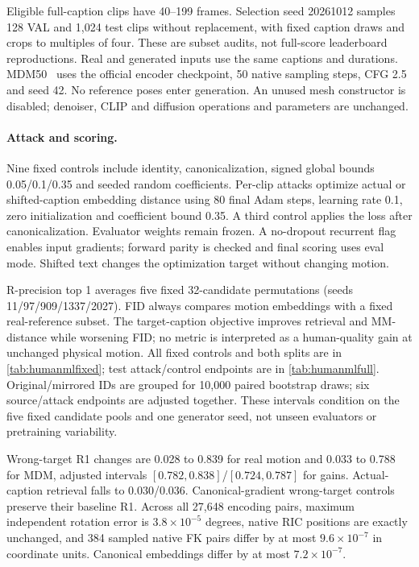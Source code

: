 \documentclass[10pt,twocolumn,letterpaper]{article}
\begin{document}
Eligible full-caption clips have 40--199 frames. Selection seed 20261012 samples 128 VAL and 1,024 test clips without replacement, with fixed caption draws and crops to multiples of four. These are subset audits, not full-score leaderboard reproductions. Real and generated inputs use the same captions and durations. MDM50~\cite{tevet2023} uses the official encoder checkpoint, 50 native sampling steps, CFG 2.5 and seed 42. No reference poses enter generation. An unused mesh constructor is disabled; denoiser, CLIP and diffusion operations and parameters are unchanged.

\paragraph{Attack and scoring.}
Nine fixed controls include identity, canonicalization, signed global bounds 0.05/0.1/0.35 and seeded random coefficients. Per-clip attacks optimize actual or shifted-caption embedding distance using 80 final Adam steps, learning rate 0.1, zero initialization and coefficient bound 0.35. A third control applies the loss after canonicalization. Evaluator weights remain frozen. A no-dropout recurrent flag enables input gradients; forward parity is checked and final scoring uses eval mode. Shifted text changes the optimization target without changing motion.

R-precision top 1 averages five fixed 32-candidate permutations (seeds 11/97/909/1337/2027). FID always compares motion embeddings with a fixed real-reference subset. The target-caption objective improves retrieval and MM-distance while worsening FID; no metric is interpreted as a human-quality gain at unchanged physical motion. All fixed controls and both splits are in \cref{tab:humanmlfixed}; test attack/control endpoints are in \cref{tab:humanmlfull}. Original/mirrored IDs are grouped for 10,000 paired bootstrap draws; six source/attack endpoints are adjusted together. These intervals condition on the five fixed candidate pools and one generator seed, not unseen evaluators or pretraining variability.




Wrong-target R1 changes are 0.028 to 0.839 for real motion and 0.033 to 0.788 for MDM, adjusted intervals $[0.782,0.838]$/$[0.724,0.787]$ for gains. Actual-caption retrieval falls to 0.030/0.036. Canonical-gradient wrong-target controls preserve their baseline R1. Across all 27,648 encoding pairs, maximum independent rotation error is $3.8\times 10^{-5}$ degrees, native RIC positions are exactly unchanged, and 384 sampled native FK pairs differ by at most $9.6\times 10^{-7}$ in coordinate units. Canonical embeddings differ by at most $7.2\times 10^{-7}$.
\end{document}
